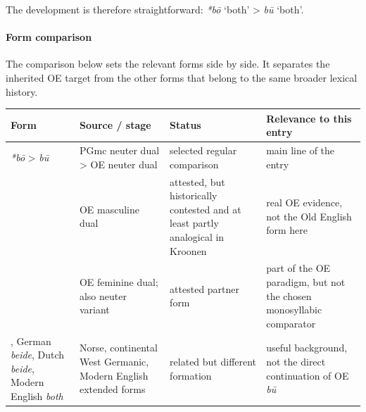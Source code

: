 \documentclass[
  british,
  a4paper,
]{article}
\newcounter{none} %
\begin{document}
The development is therefore straightforward: {\emph{*bō}} `both'
\textgreater{} {\emph{bū}} `both'.

\paragraph{Form comparison}\label{form-comparison}

The comparison below sets the relevant forms side by side. It separates
the inherited OE target from the other forms that belong to the same
broader lexical history.

{\def\LTcaptype{none} %
\begin{longtable}[]{@{}
  >{\raggedright\arraybackslash}p{}
  >{\raggedright\arraybackslash}p{}
  >{\raggedright\arraybackslash}p{}
  >{\raggedright\arraybackslash}p{}@{}}
\toprule\noalign{}
\begin{minipage}[b]{\linewidth}\raggedright
Form
\end{minipage} & \begin{minipage}[b]{\linewidth}\raggedright
Source / stage
\end{minipage} & \begin{minipage}[b]{\linewidth}\raggedright
Status
\end{minipage} & \begin{minipage}[b]{\linewidth}\raggedright
Relevance to this entry
\end{minipage} \\
\midrule\noalign{}
\endhead
\bottomrule\noalign{}
\endlastfoot
{\emph{*bō}} \textgreater{} {\emph{bū}} & PGmc neuter dual
\textgreater{} OE neuter dual & selected regular comparison & main line
of the entry \\
{\emph{bēġen}} & OE masculine dual & attested, but historically
contested and at least partly analogical in Kroonen & real OE evidence,
not the Old English form here \\
{\emph{bā}} & OE feminine dual; also neuter variant & attested partner
form & part of the OE paradigm, but not the chosen monosyllabic
comparator \\
{\emph{báðir}}, German {\emph{beide}}, Dutch {\emph{beide}}, Modern
English {\emph{both}} & Norse, continental West Germanic, Modern English
extended forms & related but different formation & useful background,
not the direct continuation of OE \emph{bū} \\
\end{longtable}
}
\end{document}
